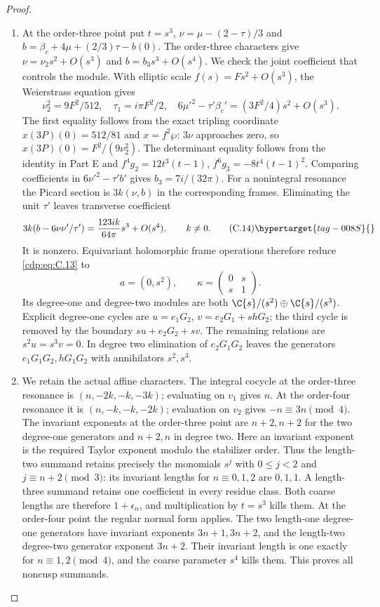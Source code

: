 \begin{proof}
\begin{enumerate}[label={$\langle1\rangle$\arabic*.},leftmargin=*]
\item At the order-three point put $t=s^3$, $\nu=\mu-(2-\tau)/3$ and $b=\beta_c+4\mu+(2/3)\tau-b(0)$. The order-three characters give $\nu=\nu_2s^2+O(s^3)$ and $b=b_3s^3+O(s^4)$. We check the joint coefficient that controls the module. With elliptic scale $f(s)=Fs^2+O(s^3)$, the Weierstrass equation gives
\[
 \nu_2^2=9F^2/512,\quad \tau_1=i\pi F^2/2,\quad
 6\mu'^2-\tau'\beta_c'=(3F^2/4)s^2+O(s^3).
\]
The first equality follows from the exact tripling coordinate $x(3P)(0)=512/81$ and $x=f^2\wp$: $3\nu$ approaches zero, so $x(3P)(0)=F^2/(9\nu_2^2)$. The determinant equality follows from the identity in Part E and $f^4g_2=12t^3(t-1)$, $f^6g_3=-8t^4(t-1)^2$. Comparing coefficients in $6\nu'^2-\tau'b'$ gives $b_3=7i/(32\pi)$. For a nonintegral resonance the Picard section is $3k(\nu,b)$ in the corresponding frames. Eliminating the unit $\tau'$ leaves transverse coefficient
\[
 3k(b-6\nu\nu'/\tau')
   =\frac{123ik}{64\pi}s^3+O(s^4),\qquad k\ne0.        \tag{C.14}\hypertarget{tag-008S}{}\label{cdp:eq:C.14}
\]
It is nonzero. Equivariant holomorphic frame operations therefore reduce \eqref{cdp:eq:C.13} to
\[
 a=(0,s^2),\qquad\kappa=\begin{pmatrix}0&s\\s&1\end{pmatrix}.
\]
Its degree-one and degree-two modules are both $\C\{s\}/(s^2)\oplus\C\{s\}/(s^3)$. Explicit degree-one cycles are $u=e_1G_2$, $v=e_2G_1+shG_2$; the third cycle is removed by the boundary $su+e_2G_2+sv$. The remaining relations are $s^2u=s^3v=0$. In degree two elimination of $e_2G_1G_2$ leaves the generators $e_1G_1G_2,hG_1G_2$ with annihilators $s^2,s^3$.

\item We retain the actual affine characters. The integral cocycle at the order-three resonance is $(n,-2k,-k,-3k)$; evaluating on $v_1$ gives $n$. At the order-four resonance it is $(n,-k,-k,-2k)$; evaluation on $v_2$ gives $-n\equiv3n\pmod4$. The invariant exponents at the order-three point are $n+2,n+2$ for the two degree-one generators and $n+2,n$ in degree two. Here an invariant exponent is the required Taylor exponent modulo the stabilizer order. Thus the length-two summand retains precisely the monomials $s^j$ with $0\le j<2$ and $j\equiv n+2\pmod3$: its invariant lengths for $n\equiv0,1,2$ are $0,1,1$. A length-three summand retains one coefficient in every residue class. Both coarse lengths are therefore $1+\epsilon_n$, and multiplication by $t=s^3$ kills them. At the order-four point the regular normal form applies. The two length-one degree-one generators have invariant exponents $3n+1,3n+2$, and the length-two degree-two generator exponent $3n+2$. Their invariant length is one exactly for $n\equiv1,2\pmod4$, and the coarse parameter $s^4$ kills them. This proves all noncusp summands.


\end{enumerate}
\end{proof}

